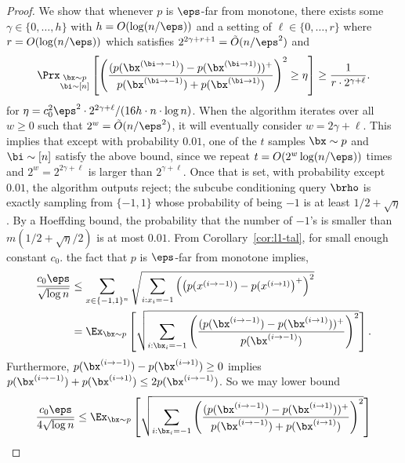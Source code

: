 \begin{proof}
    We show that whenever $p$ is $\eps$-far from monotone, there exists some $\gamma \in \{0, \dots, h\}$ with $h = O(\log(n/\eps))$ and a setting of $\ell \in \{ 0, \dots, r\}$ where $r = O(\log(n/\eps))$ which satisfies $2^{2\gamma + r +1} = \tilde{O}(n / \eps^2)$ and
    \begin{align*}
        \Prx_{ \substack{\bx \sim p \\ \bi \sim [n]}}\left[\left(\dfrac{(p(\bx^{(\bi\to-1)}) - p(\bx^{(\bi\to1)}))^+}{p(\bx^{(\bi\to-1)}) + p(\bx^{(\bi\to1)})}\right)^2 \geq \eta\right] \geq \frac{1}{r \cdot 2^{\gamma + \ell}}.
    \end{align*}
    for $\eta = c_0^2 \eps^2 \cdot 2^{2\gamma+\ell} / (16 h \cdot n \cdot \log n)$. When the algorithm iterates over all $w \geq 0$ such that $2^w = \tilde{O}(n/\eps^2)$, it will eventually consider $w = 2\gamma + \ell$.
    This implies that except with probability $0.01$, one of the $t$ samples $\bx \sim p$ and $\bi \sim [n]$ satisfy the above bound, since we repeat $t = O(2^{w}\log(n/\eps))$ times and $2^{w} = 2^{2\gamma+\ell}$ is larger than $2^{\gamma+\ell}$. Once that is set, with probability except $0.01$, the algorithm outputs reject; the subcube conditioning query $\brho$ is exactly sampling from $\{-1,1\}$ whose probability of being $-1$ is at least $1/2 + \sqrt{\eta}$. By a Hoeffding bound, the probability that the number of $-1$'s is smaller than $m(1/2 + \sqrt{\eta}/2)$ is at most $0.01$. From Corollary~\ref{cor:l1-tal}, for 
    small enough constant $c_0$. the fact that $p$ is $\eps$-far from monotone implies,
    \begin{align*}
        \frac{c_0\eps}{\sqrt{\log n}} &\leq \sum_{x \in \{-1,1\}^n} \sqrt{\sum_{i:x_i = -1} \left( \left(p(x^{(i\to-1)}) - p(x^{(i\to1)} \right)^+ \right)^2} \\
        &= \Ex_{\bx \sim p}\left[ \sqrt{\sum_{i:\bx_i=-1} \left(\dfrac{(p(\bx^{(i\to-1)}) - p(\bx^{(i\to1)}))^+}{p(\bx^{(i\to-1)})} \right)^2} \right].
    \end{align*}
    Furthermore, $p(\bx^{(i\to-1)}) - p(\bx^{(i\to1)}) \geq 0$ implies $p(\bx^{(i\to-1)}) + p(\bx^{(i\to 1)}) \leq 2 p(\bx^{(i\to-1)})$. So we may lower bound
    \begin{align}
        \frac{c_0 \eps}{4\sqrt{\log n}} \leq \Ex_{\bx \sim p}\left[ \sqrt{\sum_{i:\bx_i=-1} \left(\dfrac{(p(\bx^{(i\to-1)}) - p(\bx^{(i\to1)}))^+}{p(\bx^{(i\to-1)}) + p(\bx^{(i\to1)})} \right)^2} \right] \label{eq:exp1}
    \end{align}

\end{proof}
